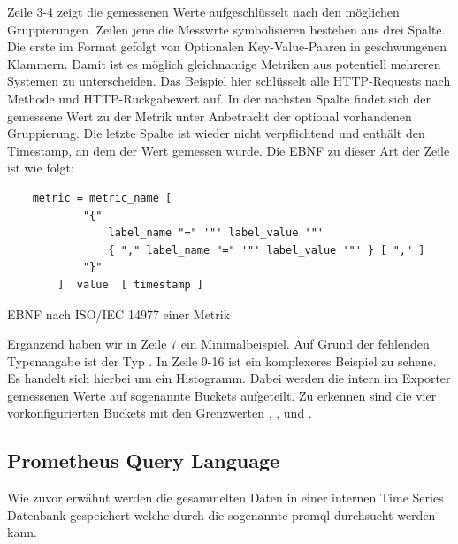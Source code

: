 Zeile 3-4 zeigt die gemessenen Werte aufgeschlüsselt nach den möglichen Gruppierungen. Zeilen jene die Messwrte symbolisieren bestehen aus drei Spalte. Die erste im Format  gefolgt von Optionalen Key-Value-Paaren in geschwungenen Klammern. Damit ist es möglich gleichnamige Metriken aus potentiell mehreren Systemen zu unterscheiden. Das Beispiel hier schlüsselt alle HTTP-Requests nach Methode und HTTP-Rückgabewert auf. In der nächsten Spalte findet sich der gemessene Wert zu der Metrik unter Anbetracht der optional vorhandenen Gruppierung. Die letzte Spalte ist wieder nicht verpflichtend und enthält den Timestamp, an dem der Wert gemessen wurde. Die EBNF zu dieser Art der Zeile ist wie folgt:
\begin{listing}[ht]
\begin{samepage}
\begin{verbatim}
	metric = metric_name [ 
			"{" 
				label_name "=" '"' label_value '"' 
				{ "," label_name "=" '"' label_value '"' } [ "," ] 
			"}" 
		]  value  [ timestamp ]
\end{verbatim}
\caption{EBNF nach ISO/IEC 14977 einer Metrik}
\end{samepage}
\end{listing}

Ergänzend haben wir in Zeile 7 ein Minimalbeispiel. Auf Grund der fehlenden Typenangabe ist der Typ . In Zeile 9-16 ist ein komplexeres Beispiel zu sehene. Es handelt sich hierbei um ein Histogramm. Dabei werden die intern im Exporter gemessenen Werte auf sogenannte Buckets aufgeteilt. Zu erkennen sind die vier vorkonfigurierten Buckets mit den Grenzwerten , ,  und . 

\subsection{Prometheus Query Language}
Wie zuvor erwähnt werden die gesammelten Daten in einer internen Time Series Datenbank gespeichert welche durch die sogenannte \gls{promql} durchsucht werden kann.

